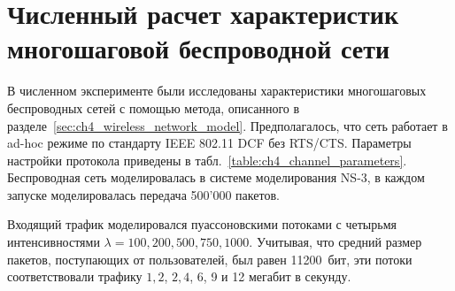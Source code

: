 \section{Численный расчет характеристик многошаговой беспроводной сети}\label{sec:ch4_results_networks}

В численном эксперименте были исследованы характеристики многошаговых беспроводных сетей с помощью метода, описанного в разделе~\ref{sec:ch4_wireless_network_model}. Предполагалось, что сеть работает в ad-hoc режиме по стандарту IEEE 802.11 DCF без RTS/CTS. Параметры настройки протокола приведены в табл.~\ref{table:ch4_channel_parameters}. Беспроводная сеть моделировалась в системе моделирования NS-3, в каждом запуске моделировалась передача 500'000 пакетов.

\begin{table}[h!]\end{table}

Входящий трафик моделировался пуассоновскими потоками с четырьмя интенсивностями $\lambda = 100, 200, 500, 750, 1000$. Учитывая, что средний размер пакетов, поступающих от пользователей, был равен 11200~бит, эти потоки соответствовали трафику $1,2$, $2,4$, 6, 9 и 12 мегабит в секунду.

